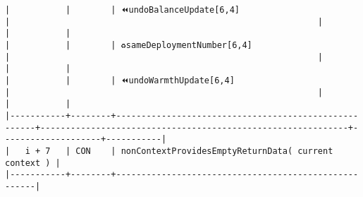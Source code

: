 \documentclass[varwidth=\maxdimen,margin=0.5cm,multi={verbatim}]{standalone}
\begin{document}
\begin{verbatim}
|           |        | ⏪undoBalanceUpdate[6,4]                             |                                                             |                    |           |
|           |        | ♻️sameDeploymentNumber[6,4]                          |                                                             |                    |           |
|           |        | ⏪undoWarmthUpdate[6,4]                              |                                                             |                    |           |
|-----------+--------+------------------------------------------------------+-------------------------------------------------------------+--------------------+-----------|
|   i + 7   | CON    | nonContextProvidesEmptyReturnData( current context ) |
|-----------+--------+------------------------------------------------------|

\end{verbatim}
\end{document}
